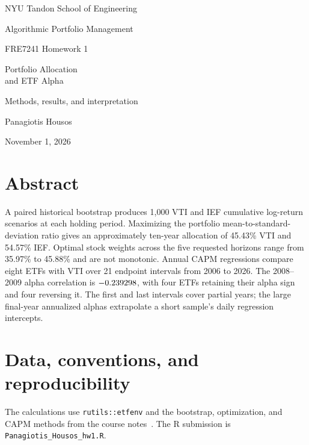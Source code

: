 \documentclass[11pt,letterpaper]{article}
\begin{document}
\hypersetup{pageanchor=false}
\begin{titlepage}
\vspace*{0.6in}
{\color{teal}\large NYU Tandon School of Engineering\par}
\vspace{0.25in}
{\color{navy}\LARGE Algorithmic Portfolio Management\par}
\vspace{0.15in}
{\large FRE7241 \quad Homework 1\par}
\vspace{0.65in}
{\color{navy}\Huge Portfolio Allocation\\[0.12in]and ETF Alpha\par}
\vspace{0.3in}
{\Large Methods, results, and interpretation\par}
\vspace{0.65in}
{\Large Panagiotis Housos\par}
\vspace{0.12in}
{\large November 1, 2026\par}
\end{titlepage}
\hypersetup{pageanchor=true}

\section*{Abstract}
A paired historical bootstrap produces 1,000 VTI and IEF cumulative
log-return scenarios at each holding period. Maximizing the portfolio
mean-to-standard-deviation ratio gives an approximately ten-year allocation
of 45.43\% VTI and 54.57\% IEF. Optimal stock weights across the five requested
horizons range from 35.97\% to 45.88\% and are not monotonic. Annual CAPM
regressions compare eight ETFs with VTI over 21 endpoint intervals from
2006 to 2026. The 2008--2009 alpha correlation is $-0.239298$,
with four ETFs retaining their alpha sign and four reversing it. The first
and last intervals cover partial years; the large final-year annualized
alphas extrapolate a short sample's daily regression intercepts.

\tableofcontents
\clearpage
{}

\section{Data, conventions, and reproducibility}
\label{sec:data}
The calculations use \texttt{rutils::etfenv} and the bootstrap, optimization,
and CAPM methods from the course notes~\cite{univariate,functions,dates,data}.
The R submission is \texttt{Panagiotis\_Housos\_hw1.R}.
\end{document}
